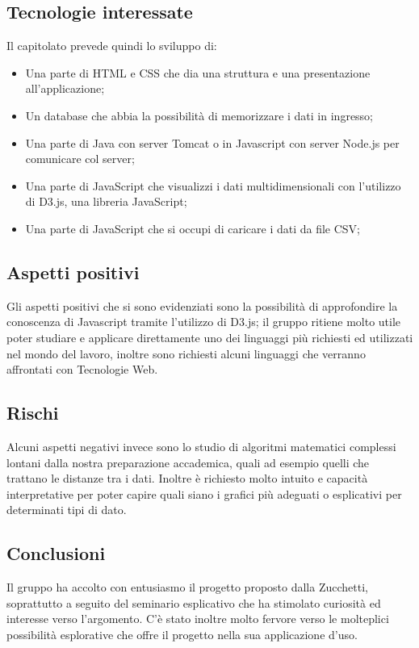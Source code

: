\documentclass[../studio-di-fattibilita.tex]{subfiles}
\begin{document}
\subsection{Tecnologie interessate}%
\label{sub:tecnologie_interessate}
Il capitolato prevede quindi lo sviluppo di:
\begin{itemize}
  \item Una parte di HTML e CSS che dia una struttura e una presentazione all’applicazione;
  \item Un database che abbia la possibilità di memorizzare i dati in ingresso;
  \item Una parte di Java con server Tomcat o in Javascript con server Node.js per comunicare col server;
  \item Una parte di JavaScript che visualizzi i dati multidimensionali con l'utilizzo di D3.js, una libreria JavaScript;
  \item Una parte di JavaScript che si occupi di caricare i dati da file CSV;
\end{itemize}

\subsection{Aspetti positivi}%
\label{sub:aspetti_positivi}
Gli aspetti positivi che si sono evidenziati sono la possibilità di approfondire la conoscenza di Javascript tramite l’utilizzo di D3.js; il gruppo ritiene molto utile poter studiare e applicare direttamente uno dei linguaggi più richiesti ed utilizzati nel mondo del lavoro, inoltre sono richiesti alcuni linguaggi che verranno affrontati con Tecnologie Web.


\subsection{Rischi}%
\label{sub:rischi}
Alcuni aspetti negativi invece sono lo studio di algoritmi matematici complessi lontani dalla nostra preparazione accademica, quali ad esempio quelli che trattano le distanze tra i dati. Inoltre è richiesto molto intuito e capacità interpretative per poter capire quali siano i grafici più adeguati o esplicativi per determinati tipi di dato.

\subsection{Conclusioni}%
\label{sub:Conclusioni}
Il gruppo ha accolto con entusiasmo il progetto proposto dalla Zucchetti, soprattutto a seguito del seminario esplicativo che ha stimolato curiosità ed interesse verso l’argomento. C’è stato inoltre molto fervore verso le molteplici possibilità esplorative che offre il progetto nella sua applicazione d’uso.
\end{document}
